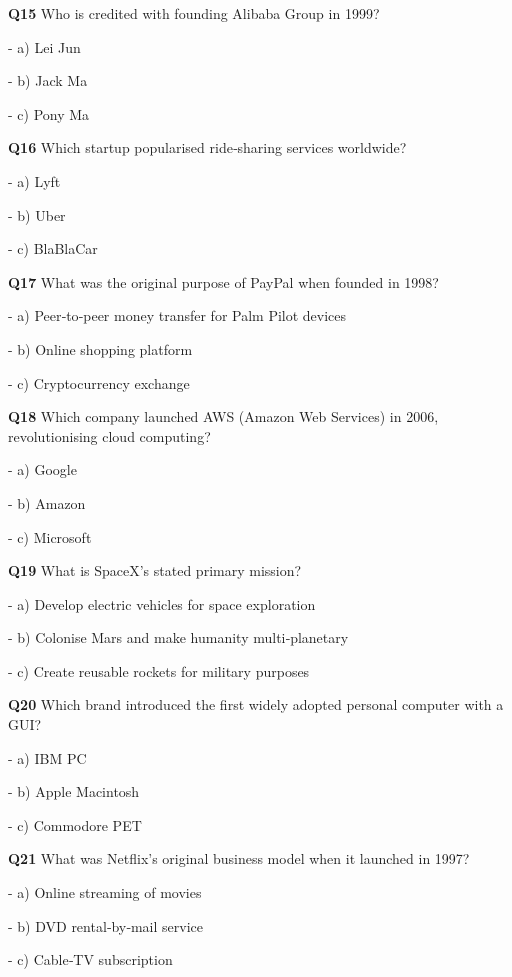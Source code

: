 \textbf{Q15} Who is credited with founding Alibaba Group in 1999?\par
\quad - a) Lei Jun\par
\quad - b) Jack Ma\par
\quad - c) Pony Ma\par

\textbf{Q16} Which startup popularised ride‑sharing services worldwide?\par
\quad - a) Lyft\par
\quad - b) Uber\par
\quad - c) BlaBlaCar\par

\textbf{Q17} What was the original purpose of PayPal when founded in 1998?\par
\quad - a) Peer‑to‑peer money transfer for Palm Pilot devices\par
\quad - b) Online shopping platform\par
\quad - c) Cryptocurrency exchange\par

\textbf{Q18} Which company launched AWS (Amazon Web Services) in 2006, revolutionising cloud computing?\par
\quad - a) Google\par
\quad - b) Amazon\par
\quad - c) Microsoft\par

\textbf{Q19} What is SpaceX's stated primary mission?\par
\quad - a) Develop electric vehicles for space exploration\par
\quad - b) Colonise Mars and make humanity multi‑planetary\par
\quad - c) Create reusable rockets for military purposes\par

\textbf{Q20} Which brand introduced the first widely adopted personal computer with a GUI?\par
\quad - a) IBM PC\par
\quad - b) Apple Macintosh\par
\quad - c) Commodore PET\par

\textbf{Q21} What was Netflix's original business model when it launched in 1997?\par
\quad - a) Online streaming of movies\par
\quad - b) DVD rental‑by‑mail service\par
\quad - c) Cable‑TV subscription\par

